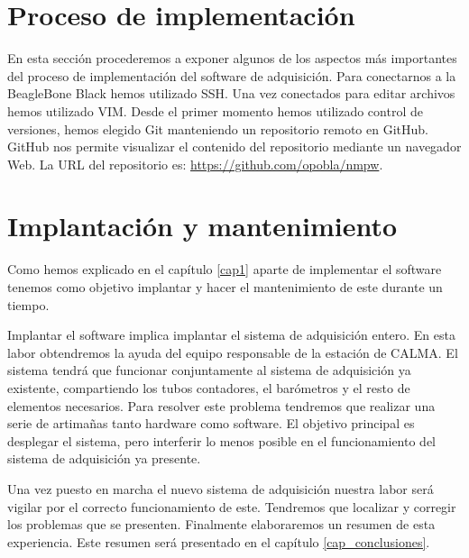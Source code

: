 \section{Proceso de implementación}
	En esta sección procederemos a exponer algunos de los aspectos más importantes del proceso de implementación del software de adquisición. Para
	conectarnos a la BeagleBone Black hemos utilizado SSH\cite{ssh}. Una vez conectados para editar archivos hemos utilizado VIM\cite{vim}. Desde
	el primer momento hemos utilizado control de versiones, hemos elegido Git\cite{git} manteniendo un repositorio remoto en GitHub\cite{github}.
	GitHub nos permite visualizar el contenido del repositorio mediante un navegador Web. La URL del repositorio es: 
	\url{https://github.com/opobla/nmpw}.

\section{Implantación y mantenimiento}
	Como hemos explicado en el capítulo \ref{cap1} aparte de implementar el software tenemos como objetivo implantar y hacer el mantenimiento de
	este durante un tiempo. 
	\par
	Implantar el software implica implantar el sistema de adquisición entero. En esta labor obtendremos la ayuda del equipo responsable de la
	estación de CALMA. El sistema tendrá que funcionar conjuntamente al sistema de adquisición ya existente, compartiendo los tubos contadores, el
	barómetros y el resto de elementos necesarios. Para resolver este problema tendremos que realizar una serie de artimañas tanto hardware como
	software. El objetivo principal es desplegar el sistema, pero interferir lo menos posible en el funcionamiento del sistema de adquisición ya presente. 
	\par
	Una vez puesto en marcha el nuevo sistema de adquisición nuestra labor será vigilar por el correcto funcionamiento de este. Tendremos que
	localizar y corregir los problemas que se presenten. Finalmente elaboraremos un resumen de esta experiencia. Este resumen será presentado en
	el capítulo \ref{cap_conclusiones}.
